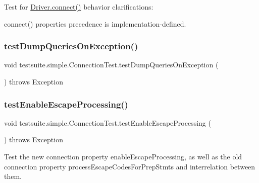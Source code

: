 Test for \mbox{\hyperlink{classcom_1_1mysql_1_1cj_1_1jdbc_1_1_non_registering_driver_ab3fd3d522550db032eab6c240b554e3e}{Driver.\+connect()}} behavior clarifications\+:
\begin{DoxyItemize}
\item connect() properties precedence is implementation-\/defined. 
\end{DoxyItemize}\mbox{\label{classtestsuite_1_1simple_1_1_connection_test_aa872b5f5448e7c9bfdcdc0db0efccda4}} 
\subsubsection{\texorpdfstring{test\+Dump\+Queries\+On\+Exception()}{testDumpQueriesOnException()}}
{\footnotesize\ttfamily void testsuite.\+simple.\+Connection\+Test.\+test\+Dump\+Queries\+On\+Exception (\begin{DoxyParamCaption}{ }\end{DoxyParamCaption}) throws Exception}

\mbox{\label{classtestsuite_1_1simple_1_1_connection_test_a64fec8e4893bf266e66b4f59ceeb323f}} 
\subsubsection{\texorpdfstring{test\+Enable\+Escape\+Processing()}{testEnableEscapeProcessing()}}
{\footnotesize\ttfamily void testsuite.\+simple.\+Connection\+Test.\+test\+Enable\+Escape\+Processing (\begin{DoxyParamCaption}{ }\end{DoxyParamCaption}) throws Exception}

Test the new connection property \textquotesingle{}enable\+Escape\+Processing\textquotesingle{}, as well as the old connection property \textquotesingle{}process\+Escape\+Codes\+For\+Prep\+Stmts\textquotesingle{} and interrelation between them.

